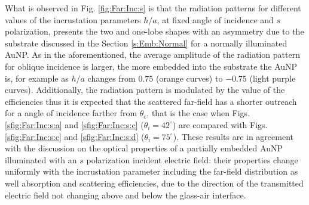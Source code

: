 What is observed in Fig. \ref{fig:Far:Inc:s} is that the radiation patterns for different values of the incrustation parameters $h/a$, at fixed angle of incidence and $s$ polarization, presents the two and one-lobe shapes with an asymmetry due to the substrate discussed in the Section \ref{s:Emb:Normal} for a normally illuminated AuNP. As in the aforementioned, the average amplitude of the radiation pattern for oblique incidence is larger, the more embedded into the substrate  the AuNP is, for example as $h/a$ changes from $0.75$ (orange curves) to $-0.75$ (light purple curves). Additionally, the radiation pattern is modulated by the value of the efficiencies  thus it is expected that the scattered far-field has a shorter outreach for a angle of incidence farther from $\theta_c$, that is the case when Figs. \ref{sfig:Far:Inc:s:a} and  \ref{sfig:Far:Inc:s:c} ($\theta_i =42^\circ$) are compared with Figs. \ref{sfig:Far:Inc:s:c} and  \ref{sfig:Far:Inc:s:d} ($\theta_i =75^\circ$). These results are in agreement with the discussion on the optical properties of a partially embedded AuNP  illuminated with an $s$ polarization incident electric field: their properties change uniformly with the incrustation parameter including the far-field distribution as well absorption and scattering efficiencies, due to the direction of the transmitted electric field not changing above and below the glass-air interface.

